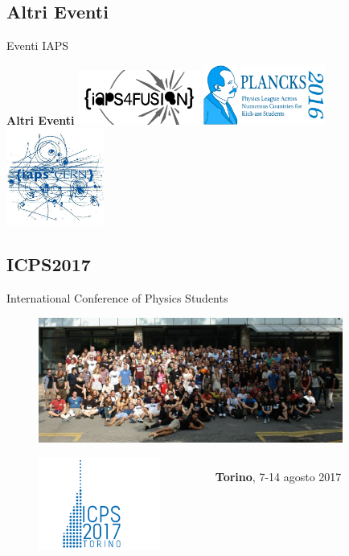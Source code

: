 \documentclass{Bredelebeamer}
\begin{document}
\subsection{Altri Eventi}
\begin{frame}{Eventi IAPS}
\begin{block}{\centering \textbf{Altri Eventi}}
\vspace{3mm} \centering
 \includegraphics[width=4cm]{images/IAPS4FUSION.png}
 \includegraphics[width=4cm]{images/PLANCKS.png} \\
 \includegraphics[width=3.2cm]{images/IAPS2CERN.jpg}
\end{block}
\end{frame}
\subsection{ICPS2017}
\begin{frame}{International Conference of Physics Students}
\begin{figure}

 
\includegraphics[width=10cm]{images/ICPS.jpg} \\
\begin{columns}
\begin{column}{0.3\textwidth}
\includegraphics[width=4cm]{images/ICPS2017.png}
\end{column}
\begin{column}{0.7\textwidth}
\Huge{\textbf{Torino}, 7-14 agosto 2017} \\
\end{column}
\end{columns}
\end{figure}
\end{frame}
\end{document}
